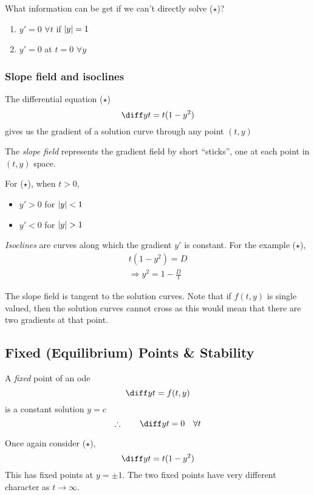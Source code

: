 \documentclass{article}
\begin{document}
\begin{remark}
    What information can be get if we can't directly solve ($\star$)?
    \begin{enumerate}
        \item $y' = 0$ $\forall t$ if $\left\lvert y\right\rvert = 1$
        \item $y' = 0$ at $t = 0$ $\forall y$
    \end{enumerate}
\end{remark}

\subsubsection{Slope field and isoclines}
The differential equation ($\star$)
\[
    \diff yt = t(1 - y^2)
\]
gives us the gradient of a solution curve through any point $(t, y)$

\begin{defi}
    The \emph{slope field} represents the gradient field by short ``sticks'', one at each point in $(t, y)$ space.
\end{defi}
\begin{eg}
    For ($\star$), when $t > 0$,
    \begin{itemize}
        \item $y' > 0$ for $\left\lvert y\right\rvert < 1$
        \item $y' < 0$ for $\left\lvert y\right\rvert > 1$
    \end{itemize} 
\end{eg}

\begin{defi}[Isoclines]
    \emph{Isoclines} are curves along which the gradient $y'$ is constant.
    For the example ($\star$), 
    \begin{align*}
        t(1-y^2) = D \\
        \Rightarrow y^2 = 1 - \frac{D}{t}
    \end{align*}
\end{defi}
\begin{remark}
    The slope field is tangent to the solution curves.
    Note that if $f(t, y)$ is single valued, then the solution curves cannot cross as this would mean that there are two gradients at that point.
\end{remark}

\subsection{Fixed (Equilibrium) Points \& Stability}
\begin{defi}
    A \emph{fixed} point of an ode
    \[
        \diff yt = f(t,y)   
    \]
    is a constant solution $y = c$
    \[
        \therefore \qquad \diff yt = 0 \quad \forall t  
    \]
\end{defi}
\begin{eg}
    Once again consider ($\star$),
    \[
        \diff yt = t(1 - y^2)  
    \]
    This has fixed points at $y = \pm 1$.
    The two fixed points have very different character as $t \rightarrow \infty$.
\end{eg}
\end{document}
